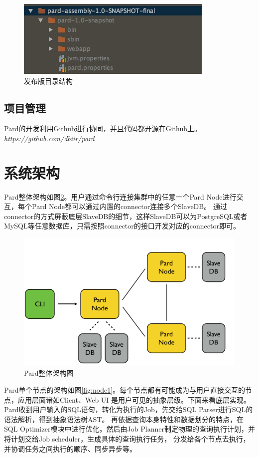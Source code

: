 \documentclass[a4paper, 12pt]{ctexart}
\begin{document}
\begin{figure}[htbp]
	\centering
	\includegraphics[scale=0.9]{figure/release.jpg}
	\caption{发布版目录结构}
	\label{fig:release}
\end{figure}


\subsection{项目管理}
Pard的开发利用Github进行协同，并且代码都开源在Github上。\textit{https://github.com/dbiir/pard} 
 
\section{系统架构}
Pard整体架构如图\ref{fig:archi}。用户通过命令行连接集群中的任意一个Pard Node进行交互，每个Pard Node都可以通过内置的connector连接多个SlaveDB。
通过connector的方式屏蔽底层SlaveDB的细节，这样SlaveDB可以为PostgreSQL或者MySQL等任意数据库，只需按照connector的接口开发对应的connector即可。

\begin{figure}[htbp]
	\centering
	\includegraphics[width=\linewidth]{figure/architecture.png}
	\caption{Pard整体架构图}
	\label{fig:archi}
\end{figure}

Pard单个节点的架构如图\ref{fig:node1}。每个节点都有可能成为与用户直接交互的节点，应用层面诸如Client、Web UI
是用户可见的抽象层级。下面来看底层实现。Pard收到用户输入的SQL语句，转化为执行的Job，先交给SQL Parser进行SQL的语法解析，得到抽象语法树AST。
再依据查询本身特性和数据划分的特点，在SQL Optimizer模块中进行优化。然后由Job Planner制定物理的查询执行计划，并将计划交给Job scheduler，生成具体的查询执行任务，
分发给各个节点去执行，并协调任务之间执行的顺序、同步异步等。
\end{document}
